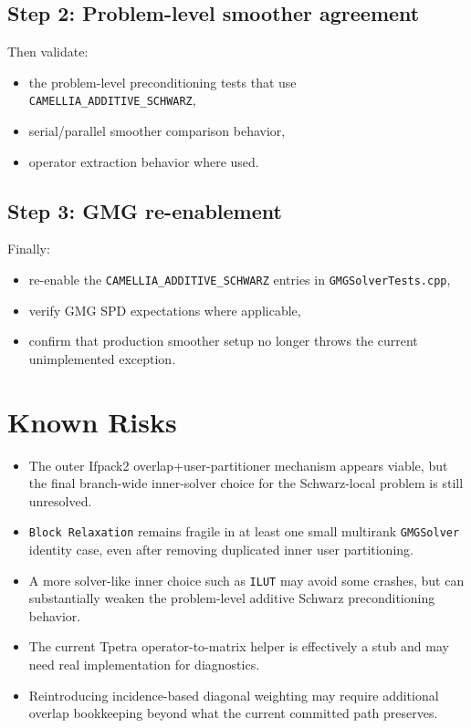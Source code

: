 \documentclass[11pt]{article}
\begin{document}
\subsection{Step 2: Problem-level smoother agreement}
Then validate:
\begin{itemize}
  \item the problem-level preconditioning tests that use \texttt{CAMELLIA\_ADDITIVE\_SCHWARZ},
  \item serial/parallel smoother comparison behavior,
  \item operator extraction behavior where used.
\end{itemize}

\subsection{Step 3: GMG re-enablement}
Finally:
\begin{itemize}
  \item re-enable the \texttt{CAMELLIA\_ADDITIVE\_SCHWARZ} entries in \texttt{GMGSolverTests.cpp},
  \item verify GMG SPD expectations where applicable,
  \item confirm that production smoother setup no longer throws the current unimplemented exception.
\end{itemize}

\section{Known Risks}
\begin{itemize}
  \item The outer Ifpack2 overlap+user-partitioner mechanism appears viable, but the final branch-wide inner-solver choice for the Schwarz-local problem is still unresolved.
  \item \texttt{Block Relaxation} remains fragile in at least one small multirank \texttt{GMGSolver} identity case, even after removing duplicated inner user partitioning.
  \item A more solver-like inner choice such as \texttt{ILUT} may avoid some crashes, but can substantially weaken the problem-level additive Schwarz preconditioning behavior.
  \item The current Tpetra operator-to-matrix helper is effectively a stub and may need real implementation for diagnostics.
  \item Reintroducing incidence-based diagonal weighting may require additional overlap bookkeeping beyond what the current committed path preserves.
\end{itemize}
\end{document}
